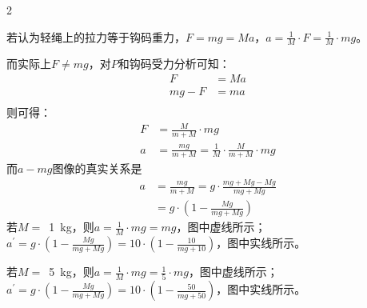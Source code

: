 \begin{multicols}{2}
{\fangsong 若认为轻绳上的拉力等于钩码重力，\(F = mg = Ma\)，\(a = \frac{1}{M}\cdot F = \frac{1}{M}\cdot mg\)。

而实际上\(F\neq mg\)，对\(P\)和钩码受力分析可知：
\begin{align*}
	F &= Ma\\
	mg - F&= ma\\
\end{align*}
则可得：
\begin{align*}
	F&= \frac{M}{m + M}\cdot mg\\
	a&= \frac{mg}{m + M} = \frac{1}{M}\cdot \frac{M}{m + M}\cdot mg
\end{align*}
而\(a - mg\)图像的真实关系是
\begin{align*}
	a &= \frac{mg}{m + M} = g\cdot \frac{mg + Mg - Mg}{mg + Mg}\\
	 &= g\cdot(1 - \frac{Mg}{mg +Mg})
\end{align*}
若\(M =\) \,\qty{1}{kg}，则\(a = \frac{1}{M}\cdot mg =  mg\)，图中虚线所示；\(a^{\prime} = g\cdot(1 - \frac{Mg}{mg + Mg}) = 10\cdot (1 - \frac{10}{mg + 10})\)，图中实线所示。

若\(M =\) \,\qty{5}{kg}，则\(a = \frac{1}{M}\cdot mg = \frac{1}{5}\cdot mg\)，图中虚线所示；\(a^{\prime} = g\cdot(1 - \frac{Mg}{mg + Mg}) = 10\cdot (1 - \frac{50}{mg + 50})\)，图中实线所示。}
\end{multicols}